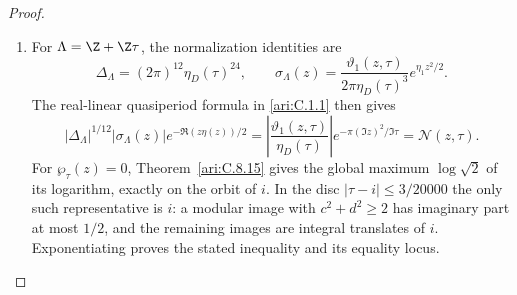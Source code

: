 \begin{proof}
\begin{enumerate}[label=\arabic*.,leftmargin=*]
\item For $\Lambda=\Z+\Z\tau$, the normalization identities are
\[
 \Delta_\Lambda=(2\pi)^{12}\eta_D(\tau)^{24},\qquad
 \sigma_\Lambda(z)=
 \frac{\vartheta_1(z,\tau)}{2\pi\eta_D(\tau)^3}
                 e^{\eta_1z^2/2}.
\]
The real-linear quasiperiod formula in \ref{ari:C.1.1} then gives
\[
 |\Delta_\Lambda|^{1/12}|\sigma_\Lambda(z)|
 e^{-\Re(z\eta(z))/2}
 =\left|\frac{\vartheta_1(z,\tau)}{\eta_D(\tau)}\right|
            e^{-\pi(\Im z)^2/\Im\tau}
 =\mathcal N(z,\tau).
\]
For $\wp_\tau(z)=0$, Theorem~\ref{ari:C.8.15} gives the
global maximum $\log\sqrt2$ of its logarithm, exactly on the
orbit of $i$. In the disc $|\tau-i|\le3/20000$ the only such
representative is $i$: a modular image with $c^2+d^2\ge2$
has imaginary part at most $1/2$, and the remaining images
are integral translates of $i$. Exponentiating proves the
stated inequality and its equality locus.
\end{enumerate}
\end{proof}




\clearpage\appendix
